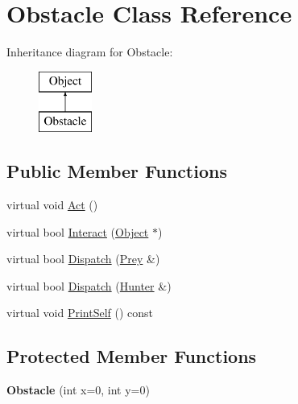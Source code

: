 \hypertarget{classObstacle}{
\section{Obstacle Class Reference}
\label{classObstacle}
}
Inheritance diagram for Obstacle:\begin{figure}[H]
\begin{center}
\leavevmode
\includegraphics[height=2cm]{classObstacle}
\end{center}
\end{figure}
\subsection*{Public Member Functions}
\begin{DoxyCompactItemize}
\item 
virtual void \hyperlink{classObstacle_a4e1f98a918838ca96638e7536e3748cb}{Act} ()
\item 
virtual bool \hyperlink{classObstacle_a53bec243dc8a00f23ec61c915aef4c3e}{Interact} (\hyperlink{classObject}{Object} $\ast$)
\item 
virtual bool \hyperlink{classObstacle_a930bb5cb375a6554ecc76f98a8ecaf0d}{Dispatch} (\hyperlink{classPrey}{Prey} \&)
\item 
virtual bool \hyperlink{classObstacle_a8428a9d636c30b7c06d31066ad0dc412}{Dispatch} (\hyperlink{classHunter}{Hunter} \&)
\item 
virtual void \hyperlink{classObstacle_ad4355e9d1db002f6db2ca15ae5605d05}{PrintSelf} () const 
\end{DoxyCompactItemize}
\subsection*{Protected Member Functions}
\begin{DoxyCompactItemize}
\item 
\hypertarget{classObstacle_a57f504fff99441f6250b98ffce750a8a}{
{\bfseries Obstacle} (int x=0, int y=0)}
\label{classObstacle_a57f504fff99441f6250b98ffce750a8a}

\end{DoxyCompactItemize}


